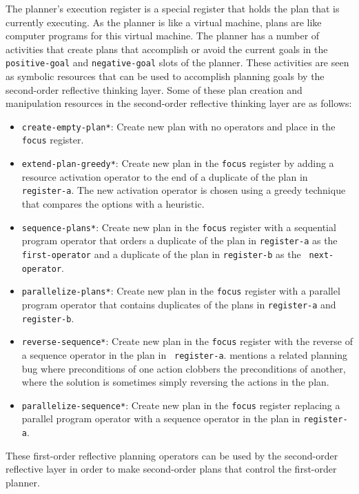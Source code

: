 The planner's execution register is a special register that holds the
plan that is currently executing.  As the planner is like a virtual
machine, plans are like computer programs for this virtual machine.
The planner has a number of activities that create plans that
accomplish or avoid the current goals in the {\tt positive-goal} and
{\tt negative-goal} slots of the planner.  These activities are seen
as symbolic resources that can be used to accomplish planning goals by
the second-order reflective thinking layer.  Some of these plan
creation and manipulation resources in the second-order reflective
thinking layer are as follows:
\begin{itemize}
\item {\tt create-empty-plan*}: Create new plan with no operators and
  place in the {\tt focus} register.
\item {\tt extend-plan-greedy*}: Create new plan in the {\tt focus}
  register by adding a resource activation operator to the end of a
  duplicate of the plan in {\tt register-a}.  The new activation
  operator is chosen using a greedy technique that compares the
  options with a heuristic.
\item {\tt sequence-plans*}: Create new plan in the {\tt focus}
  register with a sequential program operator that orders a duplicate
  of the plan in {\tt register-a} as the {\tt first-operator} and a
  duplicate of the plan in {\tt register-b} as the {\tt
    next-operator}.
\item {\tt parallelize-plans*}: Create new plan in the {\tt focus}
  register with a parallel program operator that contains duplicates
  of the plans in {\tt register-a} and {\tt register-b}.
\item {\tt reverse-sequence*}: Create new plan in the {\tt focus}
  register with the reverse of a sequence operator in the plan in {\tt
    register-a}.  \cite{sussman:1973} mentions a related planning bug
  where preconditions of one action clobbers the preconditions of
  another, where the solution is sometimes simply reversing the
  actions in the plan.
\item {\tt parallelize-sequence*}: Create new plan in the {\tt focus}
  register replacing a parallel program operator with a sequence
  operator in the plan in {\tt register-a}.
\end{itemize}
These first-order reflective planning operators can be used by the
second-order reflective layer in order to make second-order plans that
control the first-order planner.

